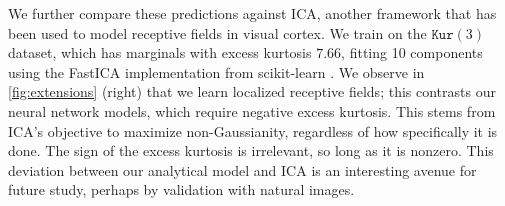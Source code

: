 We further compare these predictions against ICA, another framework that has been used to model receptive fields in visual cortex.
We train on the $\texttt{Kur}(3)$ dataset, which has marginals with excess kurtosis $7.66$, fitting 10 components using the FastICA implementation from scikit-learn \parencite{hyvarinen2000independent,scikit-learn}.
We observe in \cref{fig:extensions} (right) that we learn localized receptive fields; this contrasts our neural network models, which require negative excess kurtosis.
This stems from ICA's objective to maximize non-Gaussianity, regardless of how specifically it is done.
The sign of the excess kurtosis is irrelevant, so long as it is nonzero.
This deviation between our analytical model and ICA is an interesting avenue for future study, perhaps by validation with natural images.
